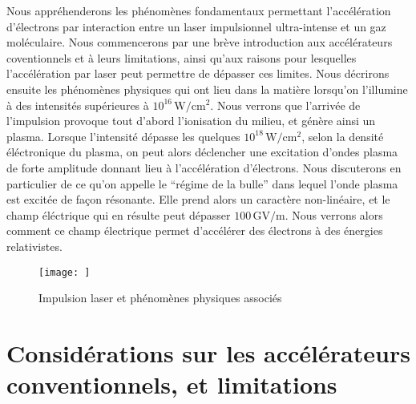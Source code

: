 \documentclass[a4paper]{book}
\begin{document}
Nous appréhenderons les phénomènes fondamentaux permettant l'accélération d'électrons par interaction entre un laser impulsionnel ultra-intense et un gaz moléculaire. Nous commencerons par une brève introduction aux accélérateurs coventionnels et à leurs limitations, ainsi qu'aux raisons pour lesquelles l'accélération par laser peut permettre de dépasser ces limites. Nous décrirons ensuite les phénomènes physiques qui ont lieu dans la matière lorsqu'on l'illumine à des intensités supérieures à $10^{16}\,\mathrm{W/cm^2}$. Nous verrons que l'arrivée de l'impulsion provoque tout d'abord l'ionisation du milieu, et génère ainsi un plasma. Lorsque l'intensité dépasse les quelques $10^{18}\,\mathrm{W/cm^2}$, selon la densité éléctronique du plasma, on peut alors déclencher une excitation d'ondes plasma de forte amplitude donnant lieu à l'accélération d'électrons. Nous discuterons en particulier de ce qu'on appelle le ``régime de la bulle'' dans lequel l'onde plasma est excitée de façon résonante. Elle prend alors un caractère non-linéaire, et le champ éléctrique qui en résulte peut dépasser $100\,\textrm{GV/m}$. Nous verrons alors comment ce champ électrique permet d'accélérer des électrons à des énergies relativistes.

\begin{figure}[!htbp]
\begin{center}
\texttt{[image: ]}
\end{center}
\caption{Impulsion laser et phénomènes physiques associés}
\label{fig:laser_matiere}
\end{figure}

\section{Considérations sur les accélérateurs conventionnels, et limitations}
\end{document}
